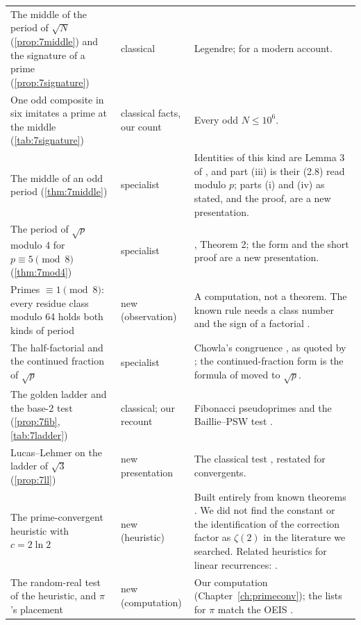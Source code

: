 \begin{longtable}{p{}p{}p{}}
The middle of the period of $\sqrt N$ (\cref{prop:7middle}) and the signature of a prime (\cref{prop:7signature}) \addedon{\revG} & classical & Legendre; \citet{Elia2019} for a modern account. \\
One odd composite in six imitates a prime at the middle (\cref{tab:7signature}) \addedon{\revG} & classical facts, our count & Every odd $N \le 10^6$. \\
The middle of an odd period (\cref{thm:7middle}) \addedon{\revG} & specialist & Identities of this kind are Lemma 3 of \citet{KaplanWilliams1986}, and part (iii) is their (2.8) read modulo $p$; parts (i) and (iv) as stated, and the proof, are a new presentation. \\
The period of $\sqrt p$ modulo 4 for $p \equiv 5 \pmod 8$ (\cref{thm:7mod4}) \addedon{\revG} & specialist & \citet{KaplanWilliams1986}, Theorem 2; the form and the short proof are a new presentation. \\
Primes $\equiv 1 \pmod 8$: every residue class modulo 64 holds both kinds of period \addedon{\revG} & new (observation) & A computation, not a theorem. The known rule needs a class number and the sign of a factorial \citep{Barkan1975}. \\
The half-factorial and the continued fraction of $\sqrt p$ \addedon{\revG} & specialist & Chowla's congruence \citep{Chowla1961}, as quoted by \citet{Williams1981}; the continued-fraction form is the formula of \citet{Barkan1975} moved to $\sqrt p$. \\
The golden ladder and the base-2 test (\cref{prop:7fib}, \cref{tab:7ladder}) \addedon{\revG} & classical; our recount & Fibonacci pseudoprimes and the Baillie--PSW test \citep{BaillieWagstaff1980,PomeranceSelfridgeWagstaff1980}. \\
Lucas--Lehmer on the ladder of $\sqrt 3$ (\cref{prop:7ll}) \addedon{\revG} & new presentation & The classical test \citep{ConradLL}, restated for convergents. \\
The prime-convergent heuristic with $c = 2\ln 2$ & new (heuristic) & Built entirely from known theorems \citep{Levy1936,Szusz1962,Moeckel1982,JagerLiardet1988}. We did not find the constant or the identification of the correction factor as $\zeta(2)$ in the literature we searched. Related heuristics for linear recurrences: \citet{GranthamGranville2024}. \\
The random-real test of the heuristic, and $\pi$'s placement & new (computation) & Our computation (Chapter~\ref{ch:primeconv}); the lists for $\pi$ match the OEIS \citep{OEIS_A086788,OEIS_A086785}. \\

\end{longtable}
